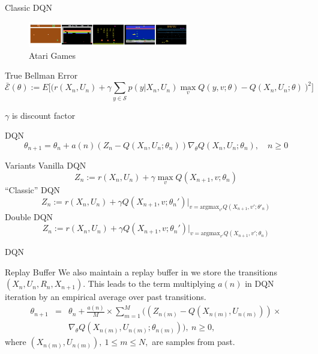 \documentclass{beamer}
\begin{document}
\begin{frame}{Classic DQN}
\begin{figure}
    \centering
    \includegraphics[width=7cm]{dqn.png}
    \caption{Atari Games}
    \label{fig:my_label}
\end{figure}
\begin{block}{True Bellman Error}
\begin{equation}
\bar{\mathcal{E}}(\theta) := E\Big[\Big(r(X_n, U_n) + \gamma\sum_{y\in\mathcal{S}} p(y|X_n,U_n)
\max_v Q(y,v; \theta) - Q(X_n,U_n;\theta)\ \Big)^2\Big] \label{Ebar}\nonumber
\end{equation}
\begin{center}
    $\gamma$ is discount factor
\end{center}
\end{block}
\end{frame}


\begin{frame}{DQN}
\begin{equation}
\theta_{n+1} = \theta_n +a(n)(Z_n - Q(X_n, U_n; \theta_n))\nabla_\theta Q(X_n, U_n; \theta_n), \quad n \geq 0 \nonumber \end{equation}

\begin{block}{Variants}
Vanilla DQN
\begin{equation}
Z_n := r(X_n,U_n)+\gamma \max_v Q(X_{n+1},v;\theta_n)\nonumber
\end{equation}
``Classic'' DQN
\begin{equation}
Z_n := r(X_n,U_n)+\gamma Q(X_{n+1},v;\theta_n')\Big|_{v = \mbox{argmax}_{v'} Q(X_{n+1}, v' ; \theta'_n)}\nonumber
\end{equation}
Double DQN
\begin{equation}
Z_n := r(X_n,U_n)+\gamma Q(X_{n+1},v;\theta_n')\Big|_{v = \mbox{argmax}_{v'} Q(X_{n+1}, v' ; \theta_n)}\nonumber
\end{equation}
\end{block}
\end{frame}

\begin{frame}{DQN}
    \begin{block}{Replay Buffer}
    We also maintain a replay buffer in we store the transitions $(X_n,U_n,R_n,X_{n+1})$. This leads to the term multiplying $a(n)$ in DQN iteration by an empirical average over past transitions.
\begin{eqnarray}
\theta_{n+1} &=& \theta_n + \frac{a(n)}{M}\times\sum_{m=1}^M\Bigg((Z_{n(m)}  - Q(X_{n(m)}, U_{n(m)}))\times\nonumber \\
&&\nabla_\theta Q(X_{n(m)}, U_{n(m)}; \theta_{n(m)})\Bigg), \ n \geq 0,\nonumber \label{DQN2}
\end{eqnarray}
where $(X_{n(m)}, U_{n(m)}),\ 1 \leq m \leq N,$ are samples from past. 
    \end{block}
\end{frame}
\end{document}
